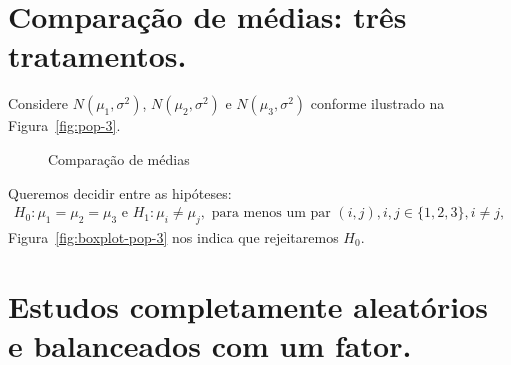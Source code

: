\documentclass[8pt]{beamer}
\begin{document}
\section{Comparação de médias: três tratamentos.}

\begin{frame}{}
Considere $N(\mu_1,\sigma^2)$, $N(\mu_2, \sigma^2)$ e  $N(\mu_3, \sigma^2)$ conforme ilustrado na Figura~\ref{fig:pop-3}.
\begin{figure}[htbp]
	\centering
	 \hfill
	\caption{Comparação de médias}
\end{figure}

Queremos decidir entre as hipóteses: 
\begin{align*}
H_0: \mu_1 = \mu_2 = \mu_3\mbox{ e }H_1: \mu_i \neq \mu_j, \mbox{ para menos um par }(i, j), i,j\in\{1, 2,3\}, i \neq j,
\end{align*}
Figura~\ref{fig:boxplot-pop-3} nos indica que rejeitaremos $H_0$.

\end{frame}

\section{Estudos completamente aleatórios e balanceados com um fator.}
\end{document}
